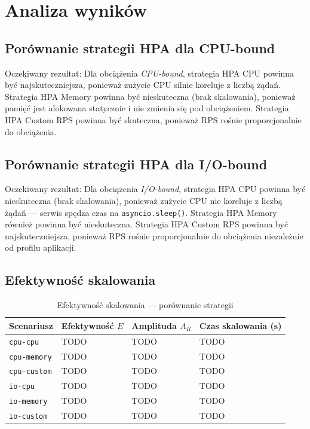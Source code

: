 \section{Analiza wyników}


\subsection{Porównanie strategii HPA dla CPU-bound}


Oczekiwany rezultat: Dla obciążenia \textit{CPU-bound}, strategia HPA CPU powinna być najskuteczniejsza, ponieważ zużycie CPU silnie koreluje z liczbą żądań. Strategia HPA Memory powinna być nieskuteczna (brak skalowania), ponieważ pamięć jest alokowana statycznie i nie zmienia się pod obciążeniem. Strategia HPA Custom RPS powinna być skuteczna, ponieważ RPS rośnie proporcjonalnie do obciążenia.

\subsection{Porównanie strategii HPA dla I/O-bound}


Oczekiwany rezultat: Dla obciążenia \textit{I/O-bound}, strategia HPA CPU powinna być nieskuteczna (brak skalowania), ponieważ zużycie CPU nie koreluje z liczbą żądań — serwis spędza czas na \texttt{asyncio.sleep()}. Strategia HPA Memory również powinna być nieskuteczna. Strategia HPA Custom RPS powinna być najskuteczniejsza, ponieważ RPS rośnie proporcjonalnie do obciążenia niezależnie od profilu aplikacji.

\subsection{Efektywność skalowania}


\begin{table}[H]
  \centering
  \begin{tabularx}{\textwidth}{|l|X|X|X|}
    \hline
    \textbf{Scenariusz} & \textbf{Efektywność $E$} & \textbf{Amplituda $A_R$} & \textbf{Czas skalowania (s)} \\
    \hline
    \texttt{cpu-cpu} & TODO & TODO & TODO \\
    \texttt{cpu-memory} & TODO & TODO & TODO \\
    \texttt{cpu-custom} & TODO & TODO & TODO \\
    \texttt{io-cpu} & TODO & TODO & TODO \\
    \texttt{io-memory} & TODO & TODO & TODO \\
    \texttt{io-custom} & TODO & TODO & TODO \\
    \hline
  \end{tabularx}
  \caption{Efektywność skalowania — porównanie strategii}
  \label{tab:efficiency}
\end{table}

